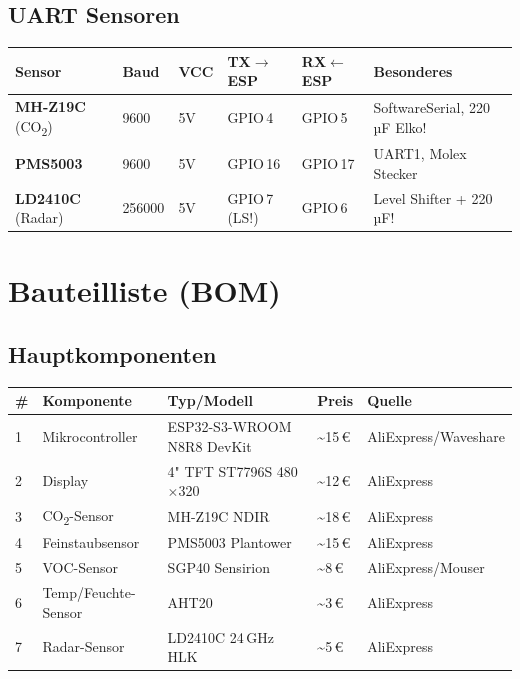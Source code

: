 \documentclass[a4paper,11pt]{article}
\begin{document}
\subsection{UART Sensoren}

\begin{longtable}{p{2.5cm} p{1.5cm} p{1.5cm} p{2cm} p{2cm} p{3cm}}
\toprule
\rowcolor{tableheader}
\textbf{Sensor} & \textbf{Baud} & \textbf{VCC} & \textbf{TX$\rightarrow$ESP} & \textbf{RX$\leftarrow$ESP} & \textbf{Besonderes} \\
\midrule
\endhead
\textbf{MH-Z19C} (CO\textsubscript{2})   & 9600   & 5V & GPIO\,4 & GPIO\,5 & SoftwareSerial, 220\,µF Elko! \\
\textbf{PMS5003}    & 9600   & 5V & GPIO\,16 & GPIO\,17 & UART1, Molex Stecker \\
\textbf{LD2410C} (Radar) & 256000 & 5V & GPIO\,7 (LS!) & GPIO\,6 & Level Shifter + 220\,µF! \\
\bottomrule
\end{longtable}

\section{Bauteilliste (BOM)}

\subsection{Hauptkomponenten}

\begin{longtable}{p{0.5cm} p{3.5cm} p{3.5cm} p{1.5cm} p{3.5cm}}
\toprule
\rowcolor{tableheader}
\textbf{\#} & \textbf{Komponente} & \textbf{Typ/Modell} & \textbf{Preis} & \textbf{Quelle} \\
\midrule
\endhead
1 & Mikrocontroller     & ESP32-S3-WROOM N8R8 DevKit & \textasciitilde15\,\euro{} & AliExpress/Waveshare \\
2 & Display             & 4" TFT ST7796S 480$\times$320 & \textasciitilde12\,\euro{} & AliExpress \\
3 & CO\textsubscript{2}-Sensor & MH-Z19C NDIR & \textasciitilde18\,\euro{} & AliExpress \\
4 & Feinstaubsensor     & PMS5003 Plantower & \textasciitilde15\,\euro{} & AliExpress \\
5 & VOC-Sensor          & SGP40 Sensirion & \textasciitilde8\,\euro{} & AliExpress/Mouser \\
6 & Temp/Feuchte-Sensor & AHT20 & \textasciitilde3\,\euro{} & AliExpress \\
7 & Radar-Sensor        & LD2410C 24\,GHz HLK & \textasciitilde5\,\euro{} & AliExpress \\
\bottomrule
\end{longtable}
\end{document}
